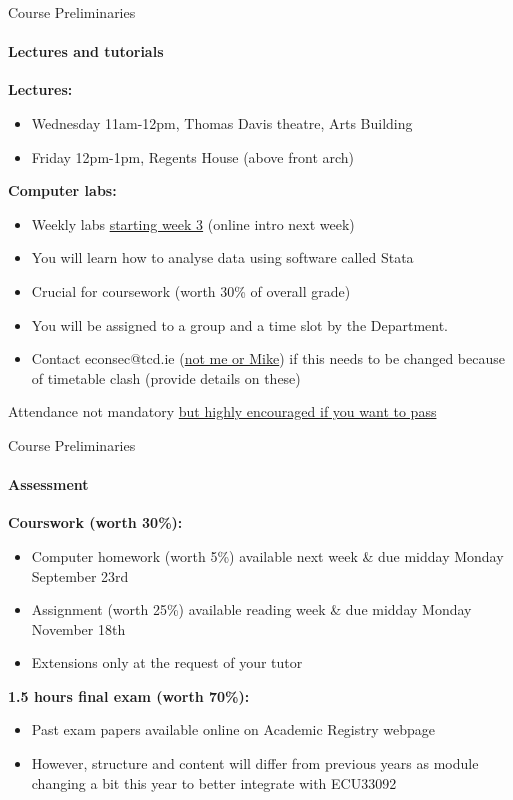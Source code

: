 \documentclass[11pt,english]{beamer}
\begin{document}
\begin{frame}{Course Preliminaries}
\framesubtitle{Lectures and tutorials}

\textbf{Lectures:}
\begin{itemize}
	\item Wednesday 11am-12pm, Thomas Davis theatre, Arts Building
	\item Friday 12pm-1pm, Regents House (above front arch)
\end{itemize}
\vspace{0.5cm}
\pause 

\textbf{Computer labs:}
\begin{itemize}
	\item Weekly labs \underline{starting week 3} (online intro next week) 
	\item You will learn how to analyse data using software called Stata
	\item Crucial for coursework (worth 30\% of overall grade)
	\item You will be assigned to a group and a time slot by the Department. 
	\item Contact econsec@tcd.ie (\underline{not me or Mike}) if this needs to be changed because of timetable clash (provide details on these)
\end{itemize}
\vspace{0.5cm}
\pause 

Attendance not mandatory \underline{but highly encouraged if you want to pass} 

\end{frame}

\begin{frame}{Course Preliminaries}
	\framesubtitle{Assessment}

\textbf{Courswork (worth 30\%):}
\begin{itemize}
	\item Computer homework (worth 5\%) available next week \& due midday Monday September 23rd
	\item Assignment (worth 25\%) available reading week \& due midday Monday November 18th
	\item Extensions only at the request of your tutor 
\end{itemize}
\vspace{1cm}
\pause 

\textbf{1.5 hours final exam (worth 70\%):}
	\begin{itemize}
		\item Past exam papers available online on Academic Registry webpage
		\item However, structure and content will differ from previous years as module changing a bit this year to better integrate with ECU33092
		
	\end{itemize}
\end{frame}
\end{document}
